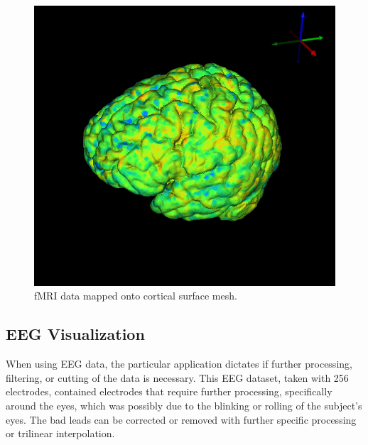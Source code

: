 \begin{figure}[H]
\begin{center}
\includegraphics[width=.75\textwidth]{Figures/fmri_1}
\caption{fMRI data mapped onto cortical surface mesh.}
\label{fig:fmrivis}
\end{center}
\end{figure}

\subsection{EEG Visualization}

When using EEG data, the particular application dictates if further processing, filtering, or cutting of the data is necessary. This EEG dataset, taken with 256 electrodes, contained electrodes that require further processing, specifically around the eyes, which was possibly due to the blinking or rolling of the subject's eyes. The bad leads can be corrected or removed with further specific processing or trilinear interpolation.

